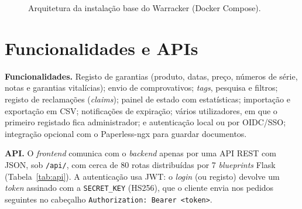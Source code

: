 \documentclass[11pt,a4paper]{article}
\newcommand{\code}[1]{\texttt{#1}}
\begin{document}
\begin{figure}[h]
\centering
{}
\caption{Arquitetura da instalação base do Warracker (Docker Compose).}
\label{fig:arq}
\end{figure}

\section{Funcionalidades e APIs}
\textbf{Funcionalidades.} Registo de garantias (produto, datas, preço, números de série, notas e
garantias vitalícias); envio de comprovativos; \emph{tags}, pesquisa e filtros; registo de reclamações
(\emph{claims}); painel de estado com estatísticas; importação e exportação em CSV; notificações de
expiração; vários utilizadores, em que o primeiro registado fica administrador; e autenticação local
ou por OIDC/SSO; integração opcional com o Paperless-ngx para guardar documentos.

\textbf{API.} O \emph{frontend} comunica com o \emph{backend} apenas por uma API REST com JSON, sob
\code{/api/}, com cerca de 80 rotas distribuídas por 7 \emph{blueprints} Flask (Tabela~\ref{tab:api}).
A autenticação usa JWT: o \emph{login} (ou registo) devolve um \emph{token} assinado com a
\code{SECRET\_KEY} (HS256), que o cliente envia nos pedidos seguintes no cabeçalho
\code{Authorization: Bearer <token>}.
\end{document}
